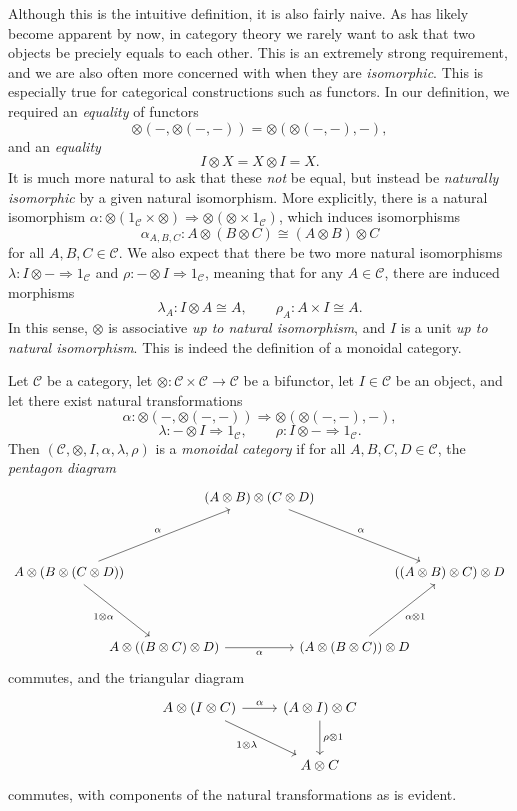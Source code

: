 Although this is the intuitive definition, it is also fairly naive. As has likely become apparent by now, in category theory we rarely want to ask that two objects be preciely equals to each other. This is an extremely strong requirement, and we are also often more concerned with when they are \emph{isomorphic}. This is especially true for categorical constructions such as functors. In our definition, we required an \emph{equality} of functors
\[
	\otimes (-,\otimes (-,-))=\otimes (\otimes (-,-),-),
\]
and an \emph{equality}
\[
	I\otimes X=X\otimes I=X
.\]
It is much more natural to ask that these \emph{not} be equal, but instead be \emph{naturally isomorphic} by a given natural isomorphism. More explicitly, there is a natural isomorphism $\alpha : \otimes (1_{\mathcal{C} }\times \otimes ) \Rightarrow \otimes (\otimes \times 1_{\mathcal{C} })$, which induces isomorphisms
\[
	\alpha_{A,B,C} : A\otimes (B\otimes C)\cong (A\otimes B)\otimes C
\]
for all $A,B,C\in \mathcal{C} $. We also expect that there be two more natural isomorphisms $\lambda : I\otimes - \Rightarrow 1_{\mathcal{C} } $ and $\rho : - \otimes I \Rightarrow 1_{\mathcal{C} } $, meaning that for any $A\in \mathcal{C} $, there are induced morphisms
\[
	\lambda_A : I\otimes A\cong A,\qquad \rho _A : A\times I\cong A
.\]
In this sense, $\otimes $ is associative \emph{up to natural isomorphism}, and $I$ is a unit \emph{up to natural isomorphism}. This is indeed the definition of a monoidal category.

\begin{definition}\label{dfn:11}
	Let $\mathcal{C} $ be a category, let $\otimes : \mathcal{C} \times \mathcal{C}  \to \mathcal{C} $ be a bifunctor, let $I\in \mathcal{C} $ be an object, and let there exist natural transformations
	\[
		\alpha : \otimes (-,\otimes (-,-)) \Rightarrow \otimes (\otimes (-,-),-),
	\]
	\[
		\lambda : -\otimes I \Rightarrow 1_{\mathcal{C} } ,\qquad \rho : I\otimes - \Rightarrow 1_{\mathcal{C} } 
	.\]
	Then $(\mathcal{C} ,\otimes ,I,\alpha ,\lambda ,\rho )$ is a \emph{monoidal category} if for all $A,B,C,D\in \mathcal{C} $, the \emph{pentagon diagram}
	\[\begin{tikzcd}[row sep = 4em, column sep = -2em]
	 &  & (A\otimes B)\otimes (C\otimes D)\ar[" \alpha  ", drr]  &  &  \\
	A\otimes (B\otimes (C\otimes D))\ar[" \alpha  ", urr] \ar[" 1\otimes \alpha  "', dr]  &  &  &  & ((A\otimes B)\otimes C)\otimes D \\
	 & A\otimes ((B\otimes C)\otimes D)\ar[" \alpha  "', rr]  &  & (A\otimes (B\otimes C))\otimes D\ar[" \alpha \otimes 1 "', ur]  & 
	\end{tikzcd}\]
	commutes, and the triangular diagram
	\[\begin{tikzcd}[row sep = 2.5em, column sep = 2.5em]
	A\otimes (I\otimes C)\ar[" \alpha  ", r] \ar[" 1\otimes \lambda  "', dr]  & (A\otimes I)\otimes C\ar[" \rho \otimes 1 ", d]  \\
	 & A\otimes C
	\end{tikzcd}\]
	commutes, with components of the natural transformations as is evident.
\end{definition}

